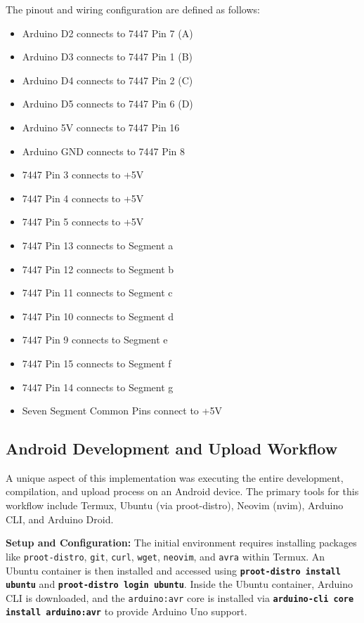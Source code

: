 \documentclass[12pt, a4paper]{report}
\begin{document}
The pinout and wiring configuration are defined as follows:
\begin{itemize}
    \item Arduino D2 connects to 7447 Pin 7 (A)
    \item Arduino D3 connects to 7447 Pin 1 (B)
    \item Arduino D4 connects to 7447 Pin 2 (C)
    \item Arduino D5 connects to 7447 Pin 6 (D)
    \item Arduino 5V connects to 7447 Pin 16
    \item Arduino GND connects to 7447 Pin 8
    \item 7447 Pin 3 connects to +5V
    \item 7447 Pin 4 connects to +5V
    \item 7447 Pin 5 connects to +5V
    \item 7447 Pin 13 connects to Segment a
    \item 7447 Pin 12 connects to Segment b
    \item 7447 Pin 11 connects to Segment c
    \item 7447 Pin 10 connects to Segment d
    \item 7447 Pin 9 connects to Segment e
    \item 7447 Pin 15 connects to Segment f
    \item 7447 Pin 14 connects to Segment g
    \item Seven Segment Common Pins connect to +5V
\end{itemize}

\subsection{Android Development and Upload Workflow}
A unique aspect of this implementation was executing the entire development, compilation, and upload process on an Android device. The primary tools for this workflow include Termux, Ubuntu (via proot-distro), Neovim (nvim), Arduino CLI, and Arduino Droid.

\textbf{Setup and Configuration:}
The initial environment requires installing packages like \texttt{proot-distro}, \texttt{git}, \texttt{curl}, \texttt{wget}, \texttt{neovim}, and \texttt{avra} within Termux. An Ubuntu container is then installed and accessed using \textbf{\texttt{proot-distro install ubuntu}} and \textbf{\texttt{proot-distro login ubuntu}}. Inside the Ubuntu container, Arduino CLI is downloaded, and the \texttt{arduino:avr} core is installed via \textbf{\texttt{arduino-cli core install arduino:avr}} to provide Arduino Uno support.
\end{document}
